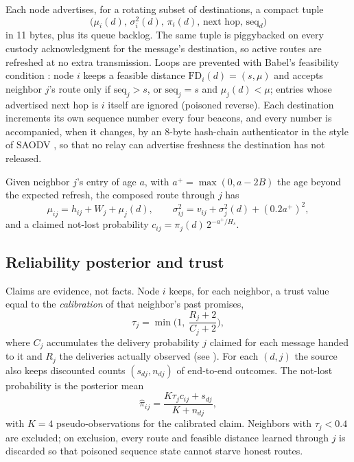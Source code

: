 \documentclass[jou,a4paper,11pt,floatsintext]{apa7}
\begin{document}
Each node advertises, for a rotating subset of destinations, a compact tuple
\[
\big(\mu_i(d),\,\sigma^2_i(d),\,\pi_i(d),\,\text{next hop},\,\text{seq}_d\big)
\]
in 11 bytes, plus its queue backlog. The same tuple is piggybacked on every custody acknowledgment for the message's destination, so active routes are refreshed at no extra transmission. Loops are prevented with Babel's feasibility condition \parencite{rfc8966}: node $i$ keeps a feasible distance $\mathrm{FD}_i(d)=(s,\mu)$ and accepts neighbor $j$'s route only if $\text{seq}_j>s$, or $\text{seq}_j=s$ and $\mu_j(d)<\mu$; entries whose advertised next hop is $i$ itself are ignored (poisoned reverse). Each destination increments its own sequence number every four beacons, and every number is accompanied, when it changes, by an 8-byte hash-chain authenticator in the style of SAODV \parencite{zapata2002}, so that no relay can advertise freshness the destination has not released.

Given neighbor $j$'s entry of age $a$, with $a^+=\max(0,a-2B)$ the age beyond the expected refresh, the composed route through $j$ has
\begin{equation}
\mu_{ij}=h_{ij}+W_j+\mu_j(d),\qquad \sigma^2_{ij}=v_{ij}+\sigma^2_j(d)+(0.2a^+)^2,
\label{eq:down}
\end{equation}
and a claimed not-lost probability $c_{ij}=\pi_j(d)\,2^{-a^+/H_s}$.

\subsection{Reliability posterior and trust}

Claims are evidence, not facts. Node $i$ keeps, for each neighbor, a trust value equal to the \emph{calibration} of that neighbor's past promises,
\begin{equation}
\tau_j=\min\!\Big(1,\ \frac{R_j+2}{C_j+2}\Big),
\label{eq:trust}
\end{equation}
where $C_j$ accumulates the delivery probability $j$ claimed for each message handed to it and $R_j$ the deliveries actually observed (see ). For each $(d,j)$ the source also keeps discounted counts $(s_{dj},n_{dj})$ of end-to-end outcomes. The not-lost probability is the posterior mean
\begin{equation}
\hat\pi_{ij}=\frac{K\tau_jc_{ij}+s_{dj}}{K+n_{dj}},
\label{eq:pi}
\end{equation}
with $K=4$ pseudo-observations for the calibrated claim. Neighbors with $\tau_j<0.4$ are excluded; on exclusion, every route and feasible distance learned through $j$ is discarded so that poisoned sequence state cannot starve honest routes.
\end{document}
